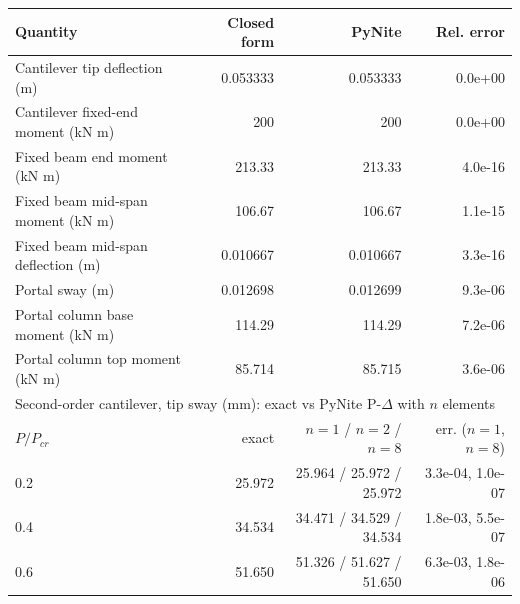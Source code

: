 \begin{tabular}{lrrr}
\toprule
Quantity & Closed form & PyNite & Rel. error \\
\midrule
Cantilever tip deflection (m) & 0.053333 & 0.053333 & 0.0e+00 \\
Cantilever fixed-end moment (kN m) & 200 & 200 & 0.0e+00 \\
Fixed beam end moment (kN m) & 213.33 & 213.33 & 4.0e-16 \\
Fixed beam mid-span moment (kN m) & 106.67 & 106.67 & 1.1e-15 \\
Fixed beam mid-span deflection (m) & 0.010667 & 0.010667 & 3.3e-16 \\
Portal sway (m) & 0.012698 & 0.012699 & 9.3e-06 \\
Portal column base moment (kN m) & 114.29 & 114.29 & 7.2e-06 \\
Portal column top moment (kN m) & 85.714 & 85.715 & 3.6e-06 \\
\midrule
\multicolumn{4}{l}{Second-order cantilever, tip sway (mm): exact vs PyNite P-$\Delta$ with $n$ elements} \\
$P/P_{cr}$ & exact & $n=1$ / $n=2$ / $n=8$ & err. ($n=1$, $n=8$) \\
0.2 & 25.972 & 25.964 / 25.972 / 25.972 & 3.3e-04, 1.0e-07 \\
0.4 & 34.534 & 34.471 / 34.529 / 34.534 & 1.8e-03, 5.5e-07 \\
0.6 & 51.650 & 51.326 / 51.627 / 51.650 & 6.3e-03, 1.8e-06 \\
\bottomrule
\end{tabular}